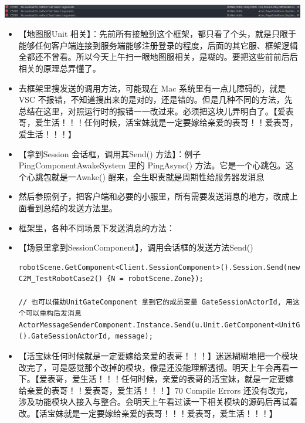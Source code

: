 \documentclass[9pt, b5paper]{article}
\begin{document}
\includegraphics[width=.9\linewidth]{./pic/et4_20230616_165027.png}
\begin{itemize}
\item 【地图服Unit 相关】：先前所有接触到这个框架，都只看了个头，就是只限于能够任何客户端连接到服务端能够注册登录的程度，后面的其它服、框架逻辑全都还不曾看。所以今天上午扫一眼地图服相关，是糊的。要把这些前前后后相关的原理总弄懂了。
\item 去框架里搜发送的调用方法，可能现在 Mac 系统里有一点儿障碍的，就是VSC 不报错，不知道搜出来的是对的，还是错的。但是几种不同的方法，先总结在这里，对照运行时的报错一一改过来。必须把这块儿弄明白了。【爱表哥，爱生活！！！任何时候，活宝妹就是一定要嫁给亲爱的表哥！！爱表哥，爱生活！！！】
\item 【拿到Session 会话框，调用其Send() 方法】：例子 PingComponentAwakeSystem 里的 PingAsync() 方法。它是一个心跳包。这个心跳包就是一Awake() 醒来，全生职责就是周期性给服务器发消息
\item 然后参照例子，把客户端和必要的小服里，所有需要发送消息的地方，改成上面看到总结的发送方法里。
\item 框架里，各种不同场景下发送消息的方法：
\item 【场景里拿到SessionComponent】，调用会话框的发送方法Send()
\begin{verbatim}
robotScene.GetComponent<Client.SessionComponent>().Session.Send(new C2M_TestRobotCase2() {N = robotScene.Zone});

// 也可以借助UnitGateComponent 拿到它的成员变量 GateSessionActorId, 用这个可以重构后发消息
ActorMessageSenderComponent.Instance.Send(u.Unit.GetComponent<UnitGateComponent>().GateSessionActorId, message);
\end{verbatim}
\item 【活宝妹任何时候就是一定要嫁给亲爱的表哥！！！】迷迷糊糊地把一个模块改完了，可是感觉那个改掉的模块，像是还没能理解透彻。明天上午会再看一下。【爱表哥，爱生活！！！任何时候，亲爱的表哥的活宝妹，就是一定要嫁给亲爱的表哥！！爱表哥，爱生活！！！】70 Compile Errors 还没有改完，涉及功能模块人接入与整合。会明天上午看过读一下相关模块的源码后再试着改。【活宝妹就是一定要嫁给亲爱的表哥！！！爱表哥，爱生活！！！】
\end{itemize}
\end{document}
